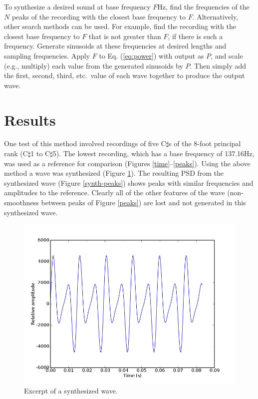 \documentclass[twocolumn]{article}
\begin{document}
To synthesize a desired sound at base frequency $F$Hz, find the frequencies of the $N$ peaks of the recording with the closest base frequency to $F$. Alternatively, other search methods can be used. For example, find the recording with the closest base frequency to $F$ that is not greater than $F$, if there is such a frequency. Generate sinusoids at these frequencies at desired lengths and sampling frequencies. Apply $F$ to Eq. (\ref{eq:power}) with output as $P$, and scale (e.g., multiply) each value from the generated sinusoids by $P$. Then simply add the first, second, third, etc.\ value of each wave together to produce the output wave.

\section{Results}

One test of this method involved recordings of five C$\sharp$s of the 8-foot principal rank (C$\sharp$1 to C$\sharp$5). The lowest recording, which has a base frequency of 137.16Hz, was used as a reference for comparison (Figures \ref{time}--\ref{peaks}). Using the above method a wave was synthesized (Figure \ref{synth-time}). The resulting PSD from the synthesized wave (Figure \ref{synth-peaks}) shows peaks with similar frequencies and amplitudes to the reference. Clearly all of the other features of the wave (non-smoothness between peaks of Figure \ref{peaks}) are lost and not generated in this synthesized wave.

\begin{figure}
\centering
\includegraphics[width=\linewidth]{figures/synth-time.png}
\caption{Excerpt of a synthesized wave.}
\label{synth-time}
\end{figure}
\end{document}
